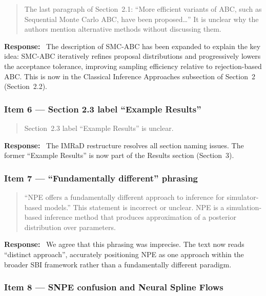 \documentclass[11pt,a4paper]{article}
\newenvironment{reviewercomment}{%
  \begin{quote}\itshape\color{reviewerblue}%
}{%
  \end{quote}%
}
\newcommand{\response}{\textbf{Response:}~}
\begin{document}
\begin{reviewercomment}
The last paragraph of Section~2.1: ``More efficient variants of ABC, such as Sequential Monte Carlo ABC, have been proposed\ldots'' It is unclear why the authors mention alternative methods without discussing them.
\end{reviewercomment}

\response
The description of SMC-ABC has been expanded to explain the key idea: SMC-ABC iteratively refines proposal distributions and progressively lowers the acceptance tolerance, improving sampling efficiency relative to rejection-based ABC. This is now in the Classical Inference Approaches subsection of Section~2 (Section~2.2).


\subsubsection*{Item 6 --- Section 2.3 label ``Example Results''}

\begin{reviewercomment}
Section~2.3 label ``Example Results'' is unclear.
\end{reviewercomment}

\response
The IMRaD restructure resolves all section naming issues. The former ``Example Results'' is now part of the Results section (Section~3).


\subsubsection*{Item 7 --- ``Fundamentally different'' phrasing}

\begin{reviewercomment}
``NPE offers a fundamentally different approach to inference for simulator-based models.'' This statement is incorrect or unclear. NPE is a simulation-based inference method that produces approximation of a posterior distribution over parameters.
\end{reviewercomment}

\response
We agree that this phrasing was imprecise. The text now reads ``distinct approach'', accurately positioning NPE as one approach within the broader SBI framework rather than a fundamentally different paradigm.


\subsubsection*{Item 8 --- SNPE confusion and Neural Spline Flows}
\end{document}
